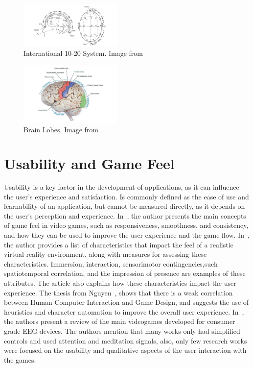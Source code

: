 \begin{figure}[htbp!]
    \centering
    \includegraphics[width=0.45\textwidth]{Figures/Related/international_10_20_system}
    \caption{International 10-20 System. Image from~\cite{luis2012brain}}\label{fig:international_10_20_system}
\end{figure}
\begin{figure}[htbp!]
    \centering
    \includegraphics[width=0.45\textwidth]{Figures/Related/brain_lobes}
    \caption{Brain Lobes. Image from~\cite{Harrison2015}}\label{fig:brain_lobes}
\end{figure}

\section{Usability and Game Feel}
Usability is a key factor in the development of applications, as it can influence the user's experience and satisfaction.
Is commonly defined as the ease of use and learnability of an application, but cannot be measured directly, as it depends on the user's perception and experience.
In~\cite{swink2008game}, the author presents the main concepts of game feel in video games, such as responsiveness, smoothness, and consistency, and how they can be used to improve the user experience and the game flow.
In~\cite{perez2018virtual}, the author provides a list of characteristics that impact the feel of a realistic virtual reality environment, along with measures for assessing these characteristics.
Immersion, interaction, sensorimotor contingencies,such spatiotemporal correlation, and the impression of presence are examples of these attributes.
The article also explains how these characteristics impact the user experience. 
The thesis from Nguyen~\cite{nguyen2012human}, shows that there is a weak correlation between Human Computer Interaction and Game Design, and suggests the use of heuristics and character automation to improve the overall user experience.
In~\cite{doi:10.1080/10447318.2019.1612213}, the authors present a review of the main videogames developed for consumer grade EEG devices.
The authors mention that many works only had simplified controls and used attention and meditation signals, also, only few research works were focused on the usability and qualitative aspects of the user interaction with the games.

